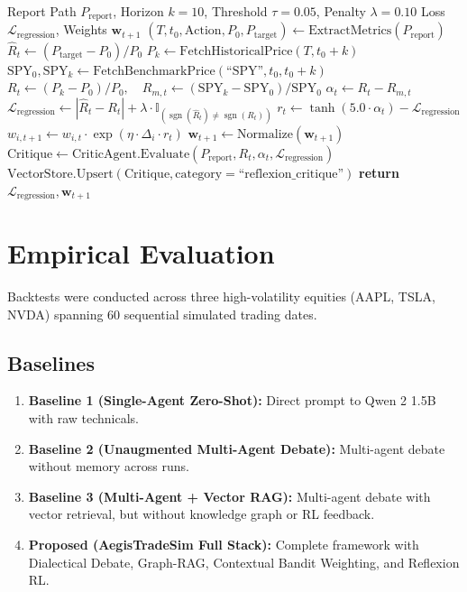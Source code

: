 \documentclass[conference]{IEEEtran}
\begin{document}
\begin{algorithm}[H]
\caption{Outcome-Driven Closed-Loop RL and Reflexion Update}
\begin{algorithmic}[1]
\REQUIRE Report Path $P_{\text{report}}$, Horizon $k=10$, Threshold $\tau=0.05$, Penalty $\lambda=0.10$
\ENSURE Loss $\mathcal{L}_{\text{regression}}$, Weights $\mathbf{w}_{t+1}$
\STATE $(T, t_0, \text{Action}, P_0, P_{\text{target}}) \leftarrow \text{ExtractMetrics}(P_{\text{report}})$
\STATE $\hat{R}_t \leftarrow (P_{\text{target}} - P_0) / P_0$
\STATE $P_k \leftarrow \text{FetchHistoricalPrice}(T, t_0 + k)$
\STATE $\text{SPY}_0, \text{SPY}_k \leftarrow \text{FetchBenchmarkPrice}(\text{``SPY''}, t_0, t_0 + k)$
\STATE $R_t \leftarrow (P_k - P_0) / P_0, \quad R_{m,t} \leftarrow (\text{SPY}_k - \text{SPY}_0) / \text{SPY}_0$
\STATE $\alpha_t \leftarrow R_t - R_{m,t}$
\STATE $\mathcal{L}_{\text{regression}} \leftarrow |\hat{R}_t - R_t| + \lambda \cdot \mathbb{I}_{(\operatorname{sgn}(\hat{R}_t) \neq \operatorname{sgn}(R_t))}$
\STATE $r_t \leftarrow \tanh(5.0 \cdot \alpha_t) - \mathcal{L}_{\text{regression}}$
    \STATE $w_{i, t+1} \leftarrow w_{i, t} \cdot \exp(\eta \cdot \Delta_i \cdot r_t)$
\ENDFOR
\STATE $\mathbf{w}_{t+1} \leftarrow \text{Normalize}(\mathbf{w}_{t+1})$
    \STATE $\text{Critique} \leftarrow \text{CriticAgent.Evaluate}(P_{\text{report}}, R_t, \alpha_t, \mathcal{L}_{\text{regression}})$
    \STATE $\text{VectorStore.Upsert}(\text{Critique}, \text{category}=\text{``reflexion\_critique''})$
\ENDIF
\STATE \textbf{return} $\mathcal{L}_{\text{regression}}, \mathbf{w}_{t+1}$
\end{algorithmic}
\end{algorithm}

\section{Empirical Evaluation}
Backtests were conducted across three high-volatility equities (AAPL, TSLA, NVDA) spanning 60 sequential simulated trading dates.

\subsection{Baselines}
\begin{enumerate}
    \item \textbf{Baseline 1 (Single-Agent Zero-Shot):} Direct prompt to Qwen 2 1.5B with raw technicals.
    \item \textbf{Baseline 2 (Unaugmented Multi-Agent Debate):} Multi-agent debate without memory across runs.
    \item \textbf{Baseline 3 (Multi-Agent + Vector RAG):} Multi-agent debate with vector retrieval, but without knowledge graph or RL feedback.
    \item \textbf{Proposed (AegisTradeSim Full Stack):} Complete framework with Dialectical Debate, Graph-RAG, Contextual Bandit Weighting, and Reflexion RL.
\end{enumerate}
\end{document}
